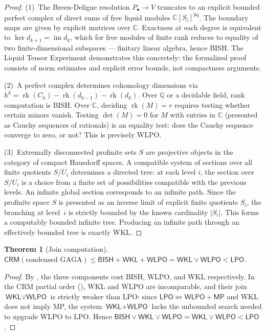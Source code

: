 \documentclass[11pt,a4paper]{article}
\theoremstyle{plain}
\newtheorem{theorem}{Theorem}[section]
\theoremstyle{definition}
\newcommand{\BISH}{\textsf{BISH}}
\newcommand{\WKL}{\textsf{WKL}}
\newcommand{\WLPO}{\textsf{WLPO}}
\newcommand{\LPO}{\textsf{LPO}}
\newcommand{\MP}{\textsf{MP}}
\newcommand{\CRM}{\textsf{CRM}}
\newcommand{\Q}{\mathbb{Q}}
\newcommand{\C}{\mathbb{C}}
\DeclareMathOperator{\rk}{rk}
\begin{document}
\begin{proof}
(1)~The Breen-Deligne resolution $P_\bullet \to V$ truncates to an explicit bounded perfect complex of direct sums of free liquid modules $\C[S_i]^{\mathrm{liq}}$.
The boundary maps are given by explicit matrices over $\C$.
Exactness at each degree is equivalent to $\ker d_{k+1} = \operatorname{im} d_k$, which for free modules of finite rank reduces to equality of two finite-dimensional subspaces --- finitary linear algebra, hence \BISH.
The Liquid Tensor Experiment \cite{Commelin2022} demonstrates this concretely: the formalized proof consists of norm estimates and explicit error bounds, not compactness arguments.

(2)~A perfect complex determines cohomology dimensions via $h^k = \rk(C_k) - \rk(d_{k-1}) - \rk(d_k)$.
Over $\Q$ or a decidable field, rank computation is \BISH.
Over $\C$, deciding $\rk(M) = r$ requires testing whether certain minors vanish.
Testing $\det(M) = 0$ for $M$ with entries in $\C$ (presented as Cauchy sequences of rationals) is an equality test: does the Cauchy sequence converge to zero, or not?
This is precisely \WLPO.

(3)~Extremally disconnected profinite sets $S$ are projective objects in the category of compact Hausdorff spaces.
A compatible system of sections over all finite quotients $S/U_i$ determines a directed tree: at each level $i$, the section over $S/U_i$ is a choice from a finite set of possibilities compatible with the previous levels.
An infinite global section corresponds to an infinite path.
Since the profinite space $S$ is presented as an inverse limit of explicit finite quotients $S_i$, the branching at level~$i$ is strictly bounded by the known cardinality $|S_i|$.
This forms a computably bounded infinite tree.
Producing an infinite path through an effectively bounded tree is exactly \WKL.
\end{proof}

\begin{theorem}[Join computation]\label{thm:join}
$\CRM(\text{condensed GAGA}) \le \BISH + \WKL + \WLPO = \WKL \vee \WLPO < \LPO$.
\end{theorem}

\begin{proof}
By , the three components cost \BISH, \WLPO, and \WKL{} respectively.
In the CRM partial order (), \WKL{} and \WLPO{} are incomparable, and their join $\WKL \vee \WLPO$ is strictly weaker than \LPO: since $\LPO \Leftrightarrow \WLPO + \MP$ and \WKL{} does not imply \MP, the system $\WKL + \WLPO$ lacks the unbounded search needed to upgrade \WLPO{} to \LPO.
Hence $\BISH \vee \WKL \vee \WLPO = \WKL \vee \WLPO < \LPO$.
\end{proof}
\end{document}
